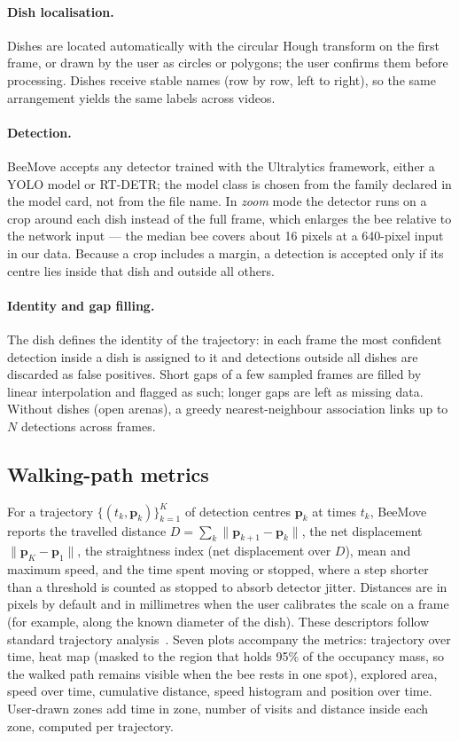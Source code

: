 \documentclass[pdflatex,sn-basic,Numbered]{sn-jnl}
\newcommand{\beemove}{BeeMove}
\theoremstyle{thmstyleone}%
\begin{document}
\paragraph{Dish localisation.} Dishes are located automatically with the circular Hough transform on the first frame, or drawn by the user as circles or polygons; the user confirms them before processing. Dishes receive stable names (row by row, left to right), so the same arrangement yields the same labels across videos.

\paragraph{Detection.} \beemove{} accepts any detector trained with the Ultralytics framework, either a YOLO model or RT-DETR; the model class is chosen from the family declared in the model card, not from the file name. In \emph{zoom} mode the detector runs on a crop around each dish instead of the full frame, which enlarges the bee relative to the network input --- the median bee covers about 16 pixels at a 640-pixel input in our data. Because a crop includes a margin, a detection is accepted only if its centre lies inside that dish and outside all others.

\paragraph{Identity and gap filling.} The dish defines the identity of the trajectory: in each frame the most confident detection inside a dish is assigned to it and detections outside all dishes are discarded as false positives. Short gaps of a few sampled frames are filled by linear interpolation and flagged as such; longer gaps are left as missing data. Without dishes (open arenas), a greedy nearest-neighbour association links up to $N$ detections across frames.

\subsection{Walking-path metrics}\label{sec:metrics}

For a trajectory $\{(t_k, \mathbf{p}_k)\}_{k=1}^{K}$ of detection centres $\mathbf{p}_k$ at times $t_k$, \beemove{} reports the travelled distance $D=\sum_{k}\lVert\mathbf{p}_{k+1}-\mathbf{p}_k\rVert$, the net displacement $\lVert\mathbf{p}_K-\mathbf{p}_1\rVert$, the straightness index (net displacement over $D$), mean and maximum speed, and the time spent moving or stopped, where a step shorter than a threshold is counted as stopped to absorb detector jitter. Distances are in pixels by default and in millimetres when the user calibrates the scale on a frame (for example, along the known diameter of the dish). These descriptors follow standard trajectory analysis~\cite{benhamou2004how,mclean2018trajr}. Seven plots accompany the metrics: trajectory over time, heat map (masked to the region that holds 95\% of the occupancy mass, so the walked path remains visible when the bee rests in one spot), explored area, speed over time, cumulative distance, speed histogram and position over time. User-drawn zones add time in zone, number of visits and distance inside each zone, computed per trajectory.
\end{document}
